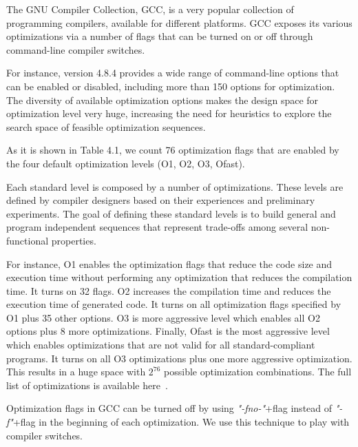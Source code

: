 \begin{table}
{\begin{tabular}[c]{|c|p{7cm}||c|p{7cm}|}
		\end{tabular}
	}
\end{table}

The GNU Compiler Collection, GCC, is a very popular collection of programming compilers, available for different platforms.
GCC exposes its various optimizations via a number of flags that can be turned on or off through command-line compiler switches. 

For instance, version 4.8.4 provides a wide range of command-line options that can be enabled or disabled, including more than 150 options for optimization. The diversity of available optimization options makes the design space for optimization level very huge, increasing the need for heuristics to explore the search space of feasible optimization sequences.

As it is shown in Table 4.1, we count 76 optimization flags that are enabled by the four default optimization levels (O1, O2, O3, Ofast). 

Each standard level is composed by a number of optimizations. These levels are defined by compiler designers based on their experiences and preliminary experiments. The goal of defining these standard levels is to build general and program independent sequences that represent trade-offs among several non-functional properties.

For instance, O1 enables the optimization flags that reduce the code size and execution time without performing any optimization that reduces the compilation time. It turns on 32 flags. 
O2 increases the compilation time and reduces the execution time of generated code. It turns on all optimization flags specified by O1 plus 35 other options. 
O3 is more aggressive level which enables all O2 options plus 8 more optimizations. 
Finally, Ofast is the most aggressive level which enables optimizations that are not valid for all standard-compliant programs. It turns on all O3 optimizations plus one more aggressive optimization. 
This results in a huge space with $2^{76}$ possible optimization combinations.
The full list of optimizations is available here~\cite{mboussaa}.

Optimization flags in GCC can be turned off by using \textit{"-fno-"}+flag instead of \textit{"-f"}+flag in the beginning of each optimization. 
We use this technique to play with compiler switches.



